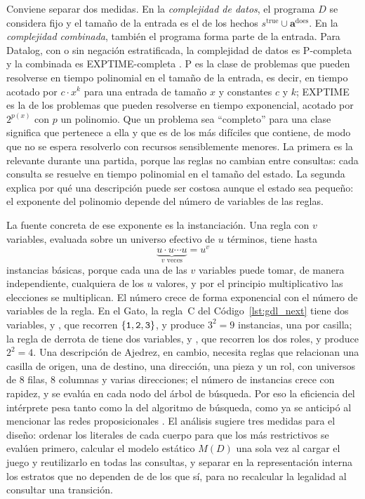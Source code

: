 Conviene separar dos medidas. En la \emph{complejidad de datos}, el programa $D$ se considera fijo y el tamaño de la entrada es el de los hechos $s^{\mathrm{true}} \cup \mathbf a^{\mathrm{does}}$. En la \emph{complejidad combinada}, también el programa forma parte de la entrada. Para Datalog, con o sin negación estratificada, la complejidad de datos es P-completa y la combinada es EXPTIME-completa \cite{Dantsin2001Complexity, AbiteboulHullVianu1995}. P es la clase de problemas que pueden resolverse en tiempo polinomial en el tamaño de la entrada, es decir, en tiempo acotado por $c \cdot x^k$ para una entrada de tamaño $x$ y constantes $c$ y $k$; EXPTIME es la de los problemas que pueden resolverse en tiempo exponencial, acotado por $2^{p(x)}$ con $p$ un polinomio. Que un problema sea ``completo'' para una clase significa que pertenece a ella y que es de los más difíciles que contiene, de modo que no se espera resolverlo con recursos sensiblemente menores. La primera es la relevante durante una partida, porque las reglas no cambian entre consultas: cada consulta se resuelve en tiempo polinomial en el tamaño del estado. La segunda explica por qué una descripción puede ser costosa aunque el estado sea pequeño: el exponente del polinomio depende del número de variables de las reglas.

La fuente concreta de ese exponente es la instanciación. Una regla con $v$ variables, evaluada sobre un universo efectivo de $u$ términos, tiene hasta
\begin{equation}
    \underbrace{u \cdot u \cdots u}_{v \text{ veces}} = u^v
    \label{eq:an_instancias}
\end{equation}
instancias básicas, porque cada una de las $v$ variables puede tomar, de manera independiente, cualquiera de los $u$ valores, y por el principio multiplicativo las elecciones se multiplican. El número crece de forma exponencial con el número de variables de la regla. En el Gato, la regla~C del Código~\ref{lst:gdl_next} tiene dos variables,  y , que recorren $\{\texttt{1}, \texttt{2}, \texttt{3}\}$, y produce $3^2 = 9$ instancias, una por casilla; la regla de derrota de  tiene dos variables,  y , que recorren los dos roles, y produce $2^2 = 4$. Una descripción de Ajedrez, en cambio, necesita reglas que relacionan una casilla de origen, una de destino, una dirección, una pieza y un rol, con universos de $8$ filas, $8$ columnas y varias direcciones; el número de instancias crece con rapidez, y se evalúa en cada nodo del árbol de búsqueda. Por eso la eficiencia del intérprete pesa tanto como la del algoritmo de búsqueda, como ya se anticipó al mencionar las redes proposicionales \cite{Goldwaser2020DRLGGP}. El análisis sugiere tres medidas para el diseño: ordenar los literales de cada cuerpo para que los más restrictivos se evalúen primero, calcular el modelo estático $M(D)$ una sola vez al cargar el juego y reutilizarlo en todas las consultas, y separar en la representación interna los estratos que no dependen de  de los que sí, para no recalcular la legalidad al consultar una transición.

